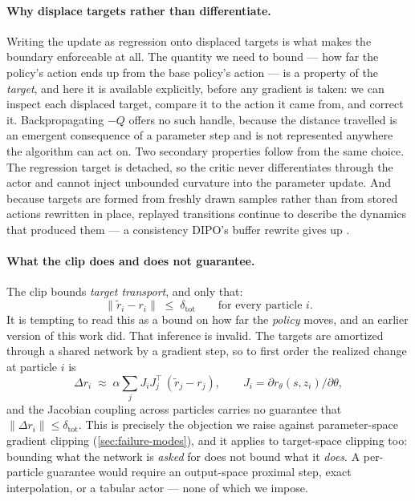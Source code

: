 \paragraph{Why displace targets rather than differentiate.} Writing the
update as regression onto displaced targets is what makes the boundary
enforceable at all. The quantity we need to bound --- how far the policy's
action ends up from the base policy's action --- is a property of the
\emph{target}, and here it is available explicitly, before any gradient is
taken: we can inspect each displaced target, compare it to the action it came
from, and correct it. Backpropagating $-Q$ offers no such handle, because the
distance travelled is an emergent consequence of a parameter step and is not
represented anywhere the algorithm can act on. Two secondary properties follow
from the same choice. The regression target is detached, so the critic never
differentiates through the actor and cannot inject unbounded curvature into
the parameter update. And because targets are formed from freshly drawn
samples rather than from stored actions rewritten in place, replayed
transitions continue to describe the dynamics that produced them --- a
consistency DIPO's buffer rewrite gives up
\citep{dipo2024}.

\paragraph{What the clip does and does not guarantee.}
The clip bounds \emph{target transport}, and only that:
\begin{equation}
  \|\tilde r_i - r_i\| \;\le\; \delta_{\mathrm{tot}}
  \qquad\text{for every particle } i .
  \label{eq:target-bound}
\end{equation}
It is tempting to read this as a bound on how far the \emph{policy} moves,
and an earlier version of this work did. That inference is invalid. The
targets are amortized through a shared network by a gradient step, so to
first order the realized change at particle $i$ is
\begin{equation}
  \Delta r_i \;\approx\; \alpha \sum_j J_i J_j^{\top}\,(\tilde r_j - r_j),
  \qquad J_i = \partial r_\theta(s,z_i)/\partial\theta ,
  \label{eq:ntk-coupling}
\end{equation}
and the Jacobian coupling across particles carries no guarantee that
$\|\Delta r_i\| \le \delta_{\mathrm{tot}}$. This is precisely the
objection we raise against parameter-space gradient clipping
(\cref{sec:failure-modes}), and it applies to target-space clipping too:
bounding what the network is \emph{asked} for does not bound what it
\emph{does}. A per-particle guarantee would require an output-space proximal
step, exact interpolation, or a tabular actor --- none of which we impose.

